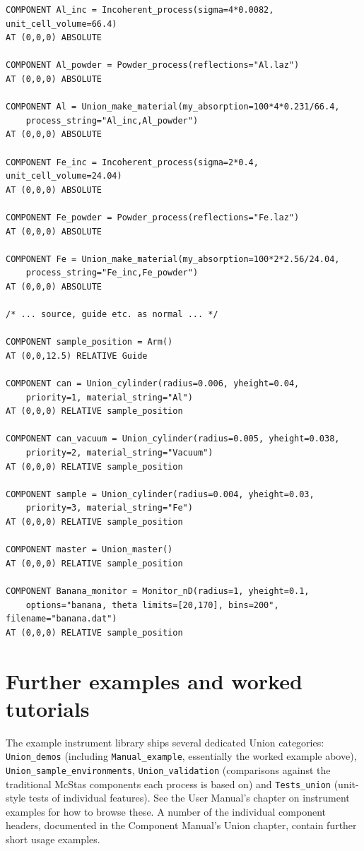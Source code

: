 \begin{lstlisting}
COMPONENT Al_inc = Incoherent_process(sigma=4*0.0082, unit_cell_volume=66.4)
AT (0,0,0) ABSOLUTE

COMPONENT Al_powder = Powder_process(reflections="Al.laz")
AT (0,0,0) ABSOLUTE

COMPONENT Al = Union_make_material(my_absorption=100*4*0.231/66.4,
    process_string="Al_inc,Al_powder")
AT (0,0,0) ABSOLUTE

COMPONENT Fe_inc = Incoherent_process(sigma=2*0.4, unit_cell_volume=24.04)
AT (0,0,0) ABSOLUTE

COMPONENT Fe_powder = Powder_process(reflections="Fe.laz")
AT (0,0,0) ABSOLUTE

COMPONENT Fe = Union_make_material(my_absorption=100*2*2.56/24.04,
    process_string="Fe_inc,Fe_powder")
AT (0,0,0) ABSOLUTE

/* ... source, guide etc. as normal ... */

COMPONENT sample_position = Arm()
AT (0,0,12.5) RELATIVE Guide

COMPONENT can = Union_cylinder(radius=0.006, yheight=0.04,
    priority=1, material_string="Al")
AT (0,0,0) RELATIVE sample_position

COMPONENT can_vacuum = Union_cylinder(radius=0.005, yheight=0.038,
    priority=2, material_string="Vacuum")
AT (0,0,0) RELATIVE sample_position

COMPONENT sample = Union_cylinder(radius=0.004, yheight=0.03,
    priority=3, material_string="Fe")
AT (0,0,0) RELATIVE sample_position

COMPONENT master = Union_master()
AT (0,0,0) RELATIVE sample_position

COMPONENT Banana_monitor = Monitor_nD(radius=1, yheight=0.1,
    options="banana, theta limits=[20,170], bins=200", filename="banana.dat")
AT (0,0,0) RELATIVE sample_position
\end{lstlisting}

\section{Further examples and worked tutorials}
\label{sec:union-further}

The example instrument library ships several dedicated Union categories:
\texttt{Union\_demos} (including \texttt{Manual\_example}, essentially the
worked example above), \texttt{Union\_sample\_environments},
\texttt{Union\_validation} (comparisons against the traditional McStas
components each process is based on) and \texttt{Tests\_union} (unit-style
tests of individual features). See the User Manual's chapter on instrument
examples for how to browse these. A number of
the individual component headers, documented in the Component Manual's
Union chapter, contain further short usage examples.

